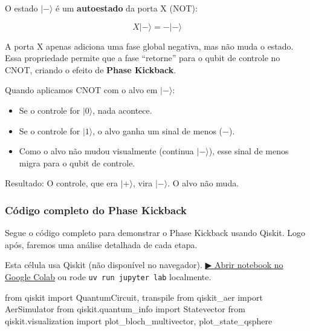 \documentclass[
  brazilian,
]{report}
\newenvironment{Shaded}{\begin{snugshade}}{\end{snugshade}}
\newcommand{\ImportTok}[1]{\textcolor[rgb]{0.00,0.46,0.62}{#1}}
\newcommand{\NormalTok}[1]{\textcolor[rgb]{0.00,0.23,0.31}{#1}}
\providecommand{\tightlist}{%
  \setlength{\itemsep}{0pt}\setlength{\parskip}{0pt}}
\begin{document}
O estado \(|-\rangle\) é um \textbf{autoestado} da porta X (NOT):

\[X|-\rangle = -|-\rangle\]

A porta X apenas adiciona uma fase global negativa, mas não muda o
estado. Essa propriedade permite que a fase ``retorne'' para o qubit de
controle no CNOT, criando o efeito de \textbf{Phase Kickback}.

Quando aplicamos CNOT com o alvo em \(|-\rangle\):

\begin{itemize}
\tightlist
\item
  Se o controle for \(|0\rangle\), nada acontece.
\item
  Se o controle for \(|1\rangle\), o alvo ganha um sinal de menos
  (\(-\)).
\item
  Como o alvo não mudou visualmente (continua \(|-\rangle\)), esse sinal
  de menos migra para o qubit de controle.
\end{itemize}

Resultado: O controle, que era \(|+\rangle\), vira \(|-\rangle\). O alvo
não muda.

\subsubsection{Código completo do Phase
Kickback}\label{cuxf3digo-completo-do-phase-kickback}

Segue o código completo para demonstrar o Phase Kickback usando Qiskit.
Logo após, faremos uma análise detalhada de cada etapa.

\begin{tcolorbox}[enhanced jigsaw, arc=.35mm, bottomrule=.15mm, bottomtitle=1mm, breakable, colback=white, colbacktitle=quarto-callout-warning-color!10!white, colframe=quarto-callout-warning-color-frame, coltitle=black, left=2mm, leftrule=.75mm, opacityback=0, opacitybacktitle=0.6, rightrule=.15mm, title=\textcolor{quarto-callout-warning-color}{\faExclamationTriangle}\hspace{0.5em}{⚛️ Célula Qiskit --- execute no Colab ou localmente}, titlerule=0mm, toprule=.15mm, toptitle=1mm]

Esta célula usa Qiskit (não disponível no navegador).
\href{https://colab.research.google.com/github/maxwellamaral/aula-quantum/blob/main/notebooks/05-interference.ipynb}{▶
Abrir notebook no Google Colab} ou rode \texttt{uv\ run\ jupyter\ lab}
localmente.

\begin{Shaded}
\begin{Highlighting}[]

\ImportTok{from}\NormalTok{ qiskit }\ImportTok{import}\NormalTok{ QuantumCircuit, transpile}
\ImportTok{from}\NormalTok{ qiskit\_aer }\ImportTok{import}\NormalTok{ AerSimulator}
\ImportTok{from}\NormalTok{ qiskit.quantum\_info }\ImportTok{import}\NormalTok{ Statevector}
\ImportTok{from}\NormalTok{ qiskit.visualization }\ImportTok{import}\NormalTok{ plot\_bloch\_multivector, plot\_state\_qsphere}
\end{Highlighting}
\end{Shaded}

\end{tcolorbox}
\end{document}
